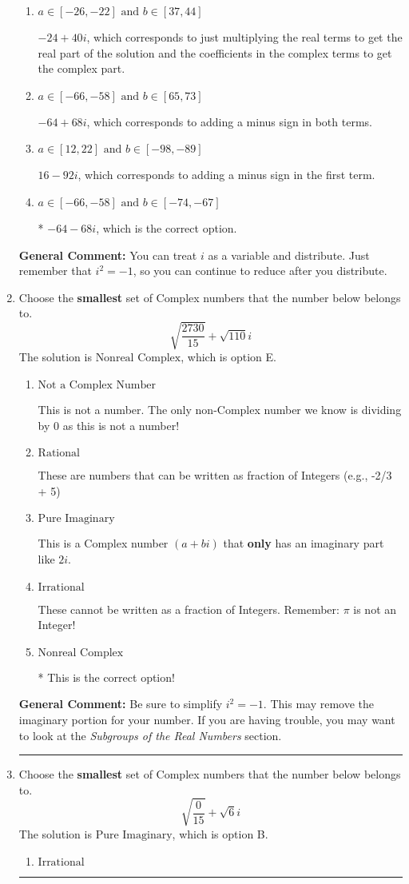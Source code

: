 \documentclass{extbook}[14pt]
\newcommand{\litem}[1]{\item #1

\rule{\textwidth}{0.4pt}}
\begin{document}
\begin{enumerate}
{\begin{enumerate}[label=\Alph*.]
 $16 + 92 i$, which corresponds to adding a minus sign in the second term.
\item \( a \in [-26, -22] \text{ and } b \in [37, 44] \)

 $-24 + 40 i$, which corresponds to just multiplying the real terms to get the real part of the solution and the coefficients in the complex terms to get the complex part.
\item \( a \in [-66, -58] \text{ and } b \in [65, 73] \)

 $-64 + 68 i$, which corresponds to adding a minus sign in both terms.
\item \( a \in [12, 22] \text{ and } b \in [-98, -89] \)

 $16 - 92 i$, which corresponds to adding a minus sign in the first term.
\item \( a \in [-66, -58] \text{ and } b \in [-74, -67] \)

* $-64 - 68 i$, which is the correct option.
\end{enumerate}

\textbf{General Comment:} You can treat $i$ as a variable and distribute. Just remember that $i^2=-1$, so you can continue to reduce after you distribute.
}
\litem{
Choose the \textbf{smallest} set of Complex numbers that the number below belongs to.
\[ \sqrt{\frac{2730}{15}}+\sqrt{110} i \]The solution is \( \text{Nonreal Complex} \), which is option E.\begin{enumerate}[label=\Alph*.]
\item \( \text{Not a Complex Number} \)

This is not a number. The only non-Complex number we know is dividing by 0 as this is not a number!
\item \( \text{Rational} \)

These are numbers that can be written as fraction of Integers (e.g., -2/3 + 5)
\item \( \text{Pure Imaginary} \)

This is a Complex number $(a+bi)$ that \textbf{only} has an imaginary part like $2i$.
\item \( \text{Irrational} \)

These cannot be written as a fraction of Integers. Remember: $\pi$ is not an Integer!
\item \( \text{Nonreal Complex} \)

* This is the correct option!
\end{enumerate}

\textbf{General Comment:} Be sure to simplify $i^2 = -1$. This may remove the imaginary portion for your number. If you are having trouble, you may want to look at the \textit{Subgroups of the Real Numbers} section.
}
\litem{
Choose the \textbf{smallest} set of Complex numbers that the number below belongs to.
\[ \sqrt{\frac{0}{15}}+\sqrt{6}i \]The solution is \( \text{Pure Imaginary} \), which is option B.\begin{enumerate}[label=\Alph*.]
\item \( \text{Irrational} \)


\end{enumerate}}
\end{enumerate}
\end{document}
